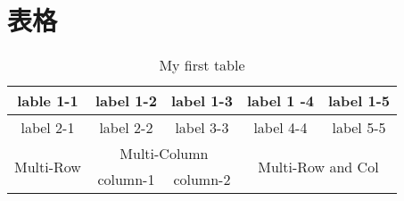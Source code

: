 \documentclass[12pt,a4paper]{report}
\begin{document}
\section{表格}
\begin{table}[!hbp]
        \begin{tabular}{|c|c|c|c|c|}
                \hline
                \hline
                lable 1-1 & label 1-2 & label 1-3 & label 1 -4 & label 1-5 \\
                \hline
                label 2-1 & label 2-2 & label 3-3 & label 4-4 & label 5-5 \\
                \hline
                \multirow{2}{*}{Multi-Row} & \multicolumn{2}{|c|}{Multi-Column} & \multicolumn{2}{|c|}{\multirow{2}{*}{Multi-Row and Col}} \\
                \cline{2-3}
                & column-1 & column-2 & \multicolumn{2}{|c|}{}\\
                \hline
        \end{tabular}
        \caption{My first table}
\end{table} 
\newpage
\end{document}
